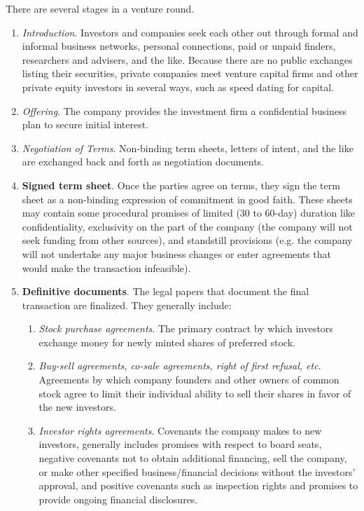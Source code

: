 \documentclass{article}
\begin{document}
    There are several stages in a venture round. 
    \begin{enumerate}
      \item \textit{Introduction}. Investors and companies seek each other out through formal and informal business networks, personal connections, paid or unpaid finders, researchers and advisers, and the like. Because there are no public exchanges listing their securities, private companies meet venture capital firms and other private equity investors in several ways, such as speed dating for capital. 
      \item \textit{Offering}. The company provides the investment firm a confidential business plan to secure initial interest. 
      \item \textit{Negotiation of Terms}. Non-binding term sheets, letters of intent, and the like are exchanged back and forth as negotiation documents. 
      \item \textbf{Signed term sheet}. Once the parties agree on terms,
      they sign the term sheet as a non-binding expression of commitment in good faith. These sheets may contain some procedural promises of limited (30 to 60-day) duration like confidentiality, exclusivity on the part of the company (the company will not seek funding from other sources), and standstill provisions (e.g. the company will not undertake any major business changes or enter agreements that would make the transaction infeasible). 
      \item \textbf{Definitive documents}. The legal papers that document the final transaction are finalized. They generally include: 
      \begin{enumerate}
          \item \textit{Stock purchase agreements}. The primary contract by which investors exchange money for newly minted shares of preferred stock. 
          \item \textit{Buy-sell agreements, co-sale agreements, right of first refusal, etc}. Agreements by which company founders and other owners of common stock agree to limit their individual ability to sell their shares in favor of the new investors. 
          \item \textit{Investor rights agreements}. Covenants the company makes to new investors, generally includes promises with respect to board seats, negative covenants not to obtain additional financing, sell the company, or make other specified business/financial decisions without the investors' approval, and positive covenants such as inspection rights and promises to provide ongoing financial disclosures. 

\end{enumerate}
\end{enumerate}
\end{document}
